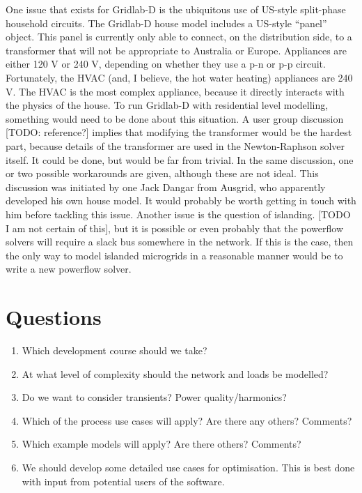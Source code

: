 \documentclass[12pt]{article}
\begin{document}
One issue that exists for Gridlab-D is the ubiquitous use of US-style split-phase household circuits. The Gridlab-D house model includes a US-style ``panel'' object. This panel is currently only able to connect, on the distribution side, to a transformer that will not be appropriate to Australia or Europe. Appliances are either 120 V or 240 V, depending on whether they use a p-n or p-p circuit. Fortunately, the HVAC (and, I believe, the hot water heating) appliances are 240 V. The HVAC is the most complex appliance, because it directly interacts with the physics of the house. To run Gridlab-D with residential level modelling, something would need to be done about this situation. A user group discussion [TODO: reference?] implies that modifying the transformer would be the hardest part, because details of the transformer are used in the Newton-Raphson solver itself. It could be done, but would be far from trivial. In the same discussion, one or two possible workarounds are given, although these are not ideal. This discussion was initiated by one Jack Dangar from Ausgrid, who apparently developed his own house model. It would probably be worth getting in touch with him before tackling this issue.  Another issue is the question of islanding. [TODO I am not certain of this], but it is possible or even probably that the powerflow solvers will require a slack bus somewhere in the network. If this is the case, then the only way to model islanded microgrids in a reasonable manner would be to write a new powerflow solver.  
\section{Questions}
\begin{enumerate}
\item Which development course should we take?
\item At what level of complexity should the network and loads be modelled?
\item Do we want to consider transients? Power quality/harmonics?
\item Which of the process use cases will apply? Are there any others? Comments?
\item Which example models will apply? Are there others? Comments?
\item We should develop some detailed use cases for optimisation. This is best done with input from potential users of
the software.
\end{enumerate}
\end{document}
